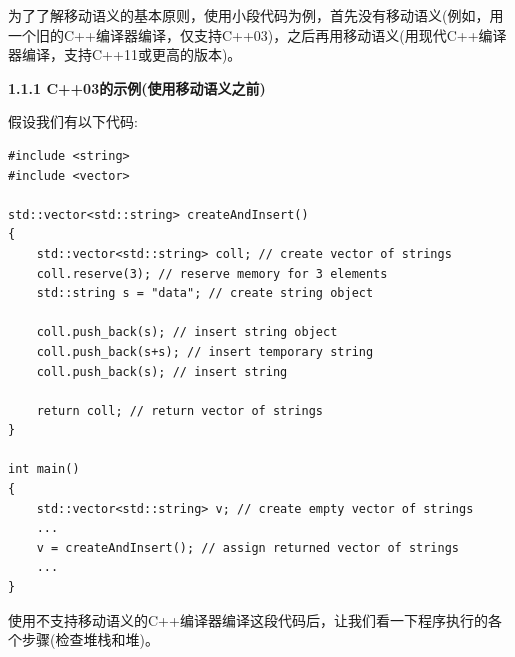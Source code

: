 为了了解移动语义的基本原则，使用小段代码为例，首先没有移动语义(例如，用一个旧的C++编译器编译，仅支持C++03)，之后再用移动语义(用现代C++编译器编译，支持C++11或更高的版本)。\par

\hspace*{\fill} \par %
\textbf{1.1.1 C++03的示例(使用移动语义之前)}

假设我们有以下代码:\par

{\color{red}{basics/motiv03.cpp}}\par

\begin{lstlisting}[caption={}]
#include <string>
#include <vector>

std::vector<std::string> createAndInsert()
{
	std::vector<std::string> coll; // create vector of strings
	coll.reserve(3); // reserve memory for 3 elements
	std::string s = "data"; // create string object
	
	coll.push_back(s); // insert string object
	coll.push_back(s+s); // insert temporary string
	coll.push_back(s); // insert string
	
	return coll; // return vector of strings
}

int main()
{
	std::vector<std::string> v; // create empty vector of strings
	...
	v = createAndInsert(); // assign returned vector of strings
	...
}
\end{lstlisting}

使用不支持移动语义的C++编译器编译这段代码后，让我们看一下程序执行的各个步骤(检查堆栈和堆)。\par

